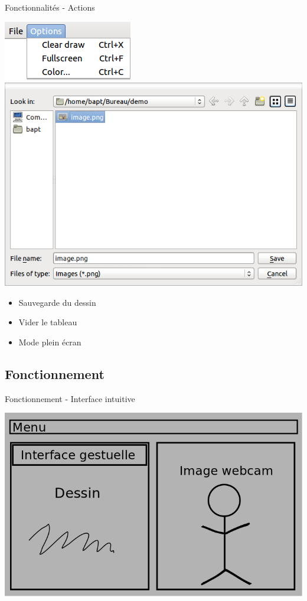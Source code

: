 \documentclass{beamer}
\begin{document}
		\begin{frame}{Fonctionnalités - Actions}
			\begin{center}
				\includegraphics[scale=0.6]{menu.png}\quad
				\includegraphics[scale=0.2]{export.png}
			\end{center}
			\begin{itemize}
				\item Sauvegarde du dessin
				\item Vider le tableau
				\item Mode plein écran
			\end{itemize}
		\end{frame}
		
		\subsection{Fonctionnement}
		\begin{frame}{Fonctionnement - Interface intuitive}
			\begin{center}
				\includegraphics[scale=0.45]{interface.png}
			\end{center}
		\end{frame}
		
\end{document}
